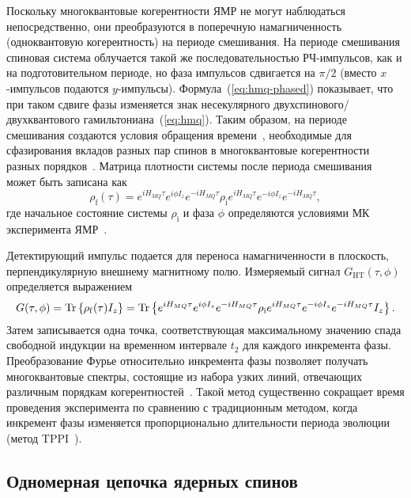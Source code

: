 Поскольку многоквантовые когерентности ЯМР не могут наблюдаться непосредственно, они преобразуются в поперечную намагниченность (одноквантовую когерентность) на периоде смешивания. На периоде смешивания спиновая система облучается такой же последовательностью РЧ-импульсов, как и на подготовительном периоде, но фаза импульсов сдвигается на $\pi/2$
(вместо $x$-импульсов подаются  $y$-импульсы).
Формула~(\ref{eq:hmq-phased}) показывает, что при таком сдвиге фазы изменяется знак несекулярного двухспинового/двухквантового гамильтониана~(\ref{eq:hmq}).
Таким образом, на периоде смешивания создаются условия обращения времени~\cite{Rhim1971},
необходимые для сфазирования вкладов разных пар спинов в многоквантовые когерентности разных порядков~\cite{Baum1985}.
%
Матрица плотности системы после периода смешивания может быть записана как~\cite{Baum1985}
\begin{equation}\label{eq:rho-after-mixing}
  \rho_\mathrm{f}(\tau)
  = e^{i{H_{MQ}}\tau} e^{i\phi I_z} e^{-i{ H_{MQ}}\tau}
  \rho_\mathrm{i}
  e^{i{ H_{MQ}}\tau} e^{-i\phi I_z} e^{-i{H_{MQ}}\tau} ,
\end{equation}
где начальное состояние системы $\rho_\mathrm{i}$
и фаза $\phi$ определяются условиями МК эксперимента ЯМР~\cite{Baum1985}.

Детектирующий импульс подается для переноса намагниченности в плоскость, перпендикулярную внешнему магнитному полю.
Измеряемый сигнал $G_\mathrm{HT}(\tau, \phi)$ определяется выражением
\begin{equation}\label{eq:signal-after-mixing}
  G(\tau, \phi)
  = \mathrm{Tr} \left\{ \rho_\mathrm{f}(\tau) I_z \right\}
  = \mathrm{Tr} \left\{ 
    e^{iH_{MQ}\tau}e^{i\phi I_z}e^{-iH_{MQ}\tau}
    \rho_\mathrm{i}
    e^{iH_{MQ}\tau}e^{-i\phi I_z}e^{-iH_{MQ}\tau}
    I_z
   \right\}.
\end{equation}
%
Затем записывается одна точка, соответствующая максимальному значению спада свободной индукции на временном интервале $t_2$ для каждого инкремента фазы.
Преобразование Фурье относительно инкремента фазы позволяет получать многоквантовые спектры,
состоящие из набора узких линий,
отвечающих различным порядкам когерентностей~\cite{Shykind1988}.
Такой метод существенно сокращает время проведения эксперимента по сравнению с традиционным методом,
когда инкремент фазы изменяется пропорционально длительности периода эволюции (метод TPPI~\cite{Baum1985}).


\subsection{Одномерная цепочка ядерных спинов}
\label{sec:model-uniform-chain}

